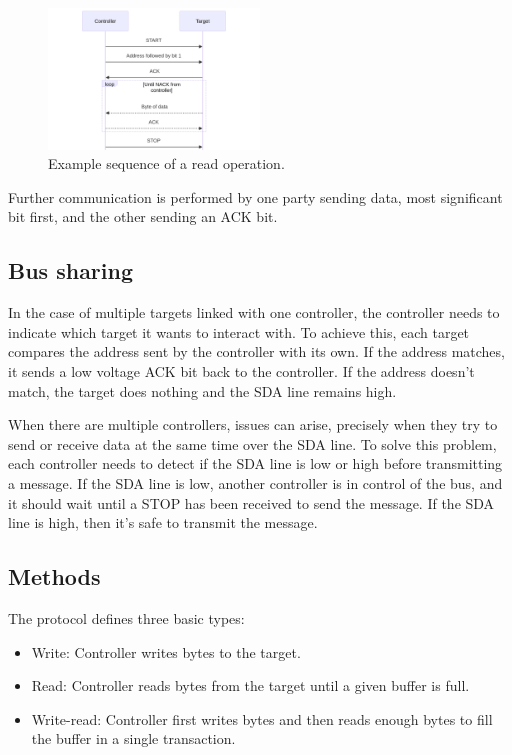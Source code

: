 \begin{figure}[h]
    \centering
    \includegraphics[width=0.5\textwidth]{figures/read_example.png}
    \caption{Example sequence of a read operation.}
    \label{fig:read_example}
\end{figure}

Further communication is performed by one party sending data, most significant bit first, and the other sending an \gls{ACK} bit.

\subsection{Bus sharing}

In the case of multiple targets linked with one controller, the controller needs to indicate which target it wants to interact with. To achieve this, each target compares the address sent by the controller with its own. If the address matches, it sends a low voltage \gls{ACK} bit back to the controller. If the address doesn't match, the target does nothing and the \gls{SDA} line remains high.

When there are multiple controllers, issues can arise, precisely when they try to send or receive data at the same time over the \gls{SDA} line. To solve this problem, each controller needs to detect if the \gls{SDA} line is low or high before transmitting a message. If the \gls{SDA} line is low, another controller is in control of the bus, and it should wait until a STOP has been received to send the message. If the \gls{SDA} line is high, then it's safe to transmit the message.

\subsection{Methods}

The protocol defines three basic types:
\begin{itemize}
    \item Write: Controller writes bytes to the target.
    \item Read: Controller reads bytes from the target until a given buffer is full.
    \item Write-read: Controller first writes bytes and then reads enough bytes to fill the buffer in a single transaction.
\end{itemize}

